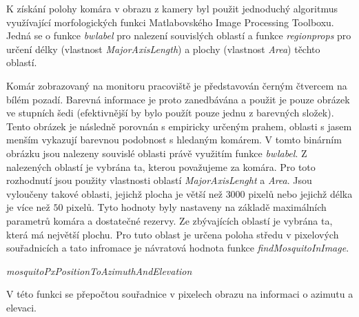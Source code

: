\documentclass[a4paper,10pt]{article}
\begin{document}
		K získání polohy komára v obrazu z kamery byl použit jednoduchý algoritmus
		využívající morfologických funkci Matlabovského Image Processing Toolboxu. Jedná
		se o funkce \textit{bwlabel} pro nalezení souvislých oblastí a funkce
		\textit{regionprops} pro určení délky (vlastnost \textit{MajorAxisLength}) a
		plochy (vlastnost \textit{Area}) těchto oblastí.


		Komár zobrazovaný na monitoru pracoviště je představován černým čtvercem na
		bílém pozadí. Barevná informace je proto zanedbávána a použit je pouze obrázek
		ve stupních šedi (efektivnější by bylo použít pouze jednu z barevných složek).
		Tento obrázek je následně porovnán s empiricky určeným prahem, oblasti s jasem
		menším vykazují barevnou podobnost s hledaným komárem. V tomto binárním obrázku
		jsou nalezeny souvislé oblasti právě využitím funkce \textit{bwlabel}. Z
		nalezených oblastí je vybrána ta, kterou považujeme za komára. Pro toto
		rozhodnutí jsou použity vlastnosti oblastí \textit{MajorAxisLenght} a
		\textit{Area}. Jsou vyloučeny takové oblasti, jejichž plocha je větší než $3000$
		pixelů nebo jejichž délka je více než $50$ pixelů. Tyto hodnoty byly nastaveny
		na základě maximálních parametrů komára a dostatečné rezervy. Ze zbývajících
		oblastí je vybrána ta, která má největší plochu. Pro tuto oblast je určena
		poloha středu v pixelových souřadnicích a tato infromace je návratová hodnota
		funkce \textit{findMosquitoInImage}.


\vspace{0.5cm}
\textit{mosquitoPxPositionToAzimuthAndElevation}

		V této funkci se přepočtou souřadnice v pixelech obrazu na informaci o azimutu a
		elevaci.
\end{document}
